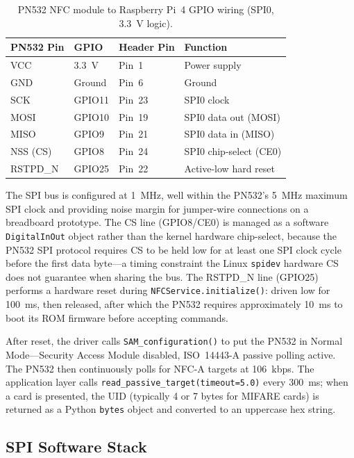 \documentclass[conference]{IEEEtran}
\begin{document}
\begin{table}[t]
\centering
\caption{PN532 NFC module to Raspberry Pi~4 GPIO wiring (SPI0, 3.3~V logic).}
\label{tab:pn532_wiring}
\begin{tabular}{llll}
  \toprule
  PN532 Pin & GPIO & Header Pin & Function \\
  \midrule
  VCC      & 3.3~V   & Pin~1  & Power supply \\
  GND      & Ground  & Pin~6  & Ground \\
  SCK      & GPIO11  & Pin~23 & SPI0 clock \\
  MOSI     & GPIO10  & Pin~19 & SPI0 data out (MOSI) \\
  MISO     & GPIO9   & Pin~21 & SPI0 data in (MISO) \\
  NSS (CS) & GPIO8   & Pin~24 & SPI0 chip-select (CE0) \\
  RSTPD\_N & GPIO25  & Pin~22 & Active-low hard reset \\
  \bottomrule
\end{tabular}
\end{table}

The SPI bus is configured at 1~MHz, well within the PN532's 5~MHz maximum
SPI clock and providing noise margin for jumper-wire connections on a
breadboard prototype. The CS line (GPIO8/CE0) is managed as a software
\texttt{DigitalInOut} object rather than the kernel hardware chip-select,
because the PN532 SPI protocol requires CS to be held low for at least one
SPI clock cycle before the first data byte—a timing constraint the Linux
\texttt{spidev} hardware CS does not guarantee when sharing the bus. The
RSTPD\_N line (GPIO25) performs a hardware reset during
\texttt{NFCService.initialize()}: driven low for 100~ms, then released,
after which the PN532 requires approximately 10~ms to boot its ROM firmware
before accepting commands.

After reset, the driver calls \texttt{SAM\_configuration()} to put the
PN532 in Normal Mode—Security Access Module disabled, ISO~14443-A passive
polling active. The PN532 then continuously polls for NFC-A targets at
106~kbps. The application layer calls \texttt{read\_passive\_target(timeout=5.0)}
every 300~ms; when a card is presented, the UID (typically 4 or 7 bytes for
MIFARE cards) is returned as a Python \texttt{bytes} object and converted to
an uppercase hex string.

\subsection{SPI Software Stack}
\end{document}
